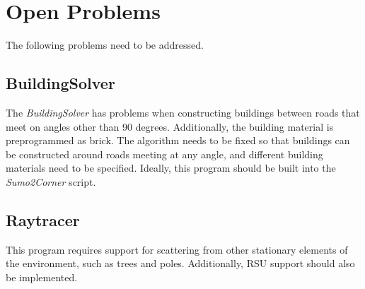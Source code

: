 \section{Open Problems}

The following problems need to be addressed.

\subsection{BuildingSolver}

The \textit{BuildingSolver} has problems when constructing buildings between roads that meet on angles other than 90 degrees. Additionally, the building material is preprogrammed as brick. The algorithm needs to be fixed so that buildings can be constructed around roads meeting at any angle, and different building materials need to be specified. Ideally, this program should be built into the \textit{Sumo2Corner} script.

\subsection{Raytracer}

This program requires support for scattering from other stationary elements of the environment, such as trees and poles. Additionally, RSU support should also be implemented.

